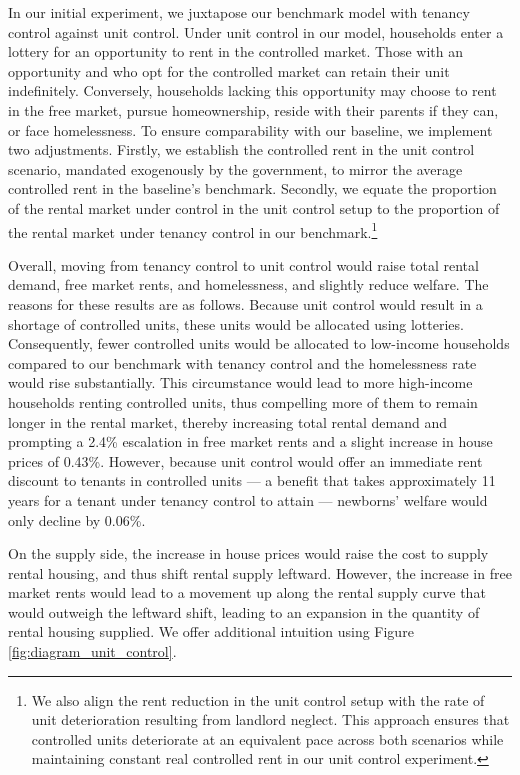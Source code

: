 \documentclass[parskip=full]{article}
\begin{document}
In our initial experiment, we juxtapose our benchmark model with tenancy control against unit control. Under unit control in our model, households enter a lottery for an opportunity to rent in the controlled market. Those with an opportunity and who opt for the controlled market can retain their unit indefinitely. Conversely, households lacking this opportunity may choose to rent in the free market, pursue homeownership, reside with their parents if they can, or face homelessness. To ensure comparability with our baseline, we implement two adjustments. Firstly, we establish the controlled rent in the unit control scenario, mandated exogenously by the government, to mirror the average controlled rent in the baseline's benchmark. Secondly, we equate the proportion of the rental market under control in the unit control setup to the proportion of the rental market under tenancy control in our benchmark.\footnote{We also align the rent reduction in the unit control setup with the rate of unit deterioration resulting from landlord neglect. This approach ensures that controlled units deteriorate at an equivalent pace across both scenarios while maintaining constant real controlled rent in our unit control experiment.}

Overall, moving from tenancy control to unit control would raise total rental demand, free market rents, and homelessness, and slightly reduce welfare. The reasons for these results are as follows. Because unit control would result in a shortage of controlled units, these units would be allocated using lotteries. Consequently, fewer controlled units would be allocated to low-income households compared to our benchmark with tenancy control and the homelessness rate would rise substantially. This circumstance would lead to more high-income households renting controlled units, thus compelling more of them to remain longer in the rental market, thereby increasing total rental demand and prompting a 2.4\% escalation in free market rents and a slight increase in house prices of 0.43\%. However, because unit control would offer an immediate rent discount to tenants in controlled units --- a benefit that takes approximately 11 years for a tenant under tenancy control to attain --- newborns' welfare would only decline by 0.06\%. 

On the supply side, the increase in house prices would raise the cost to supply rental housing, and thus shift rental supply leftward. However, the increase in free market rents would lead to a movement up along the rental supply curve that would outweigh the leftward shift, leading to an expansion in the quantity of rental housing supplied. We offer additional intuition using Figure \ref{fig:diagram_unit_control}.
\end{document}
